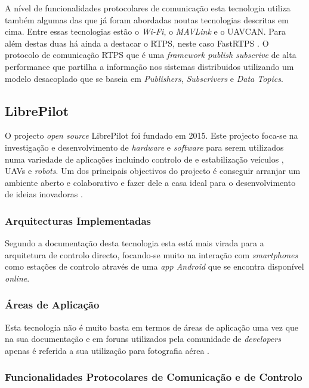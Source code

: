 A nível de funcionalidades protocolares de comunicação esta tecnologia utiliza também algumas das que já foram abordadas noutas tecnologias descritas em cima. Entre essas tecnologias estão o \textit{Wi-Fi}, o \textit{MAVLink} e o UAVCAN. Para além destas duas há ainda a destacar o RTPS, neste caso FastRTPS \cite{DronecodeProject}. O protocolo de comunicação RTPS que é uma \textit{framework publish subscrive} de alta performance que partilha a informação nos sistemas distribuidos utilizando um modelo desacoplado que se baseia em \textit{Publishers}, \textit{Subscrivers} e \textit{Data Topics}\cite{EProsima}.

\subsection{LibrePilot}

O projecto \textit{open source} LibrePilot foi fundado em 2015. Este projecto foca-se na investigação e desenvolvimento de \textit{hardware} e \textit{software} para serem utilizados numa variedade de aplicações incluindo controlo de e estabilização veículos , UAVs e \textit{robots}. Um dos principais objectivos do projecto é conseguir arranjar um ambiente aberto e colaborativo e fazer dele a casa ideal para o desenvolvimento de ideias inovadoras \cite{LibrePilot}.

\subsubsection{Arquitecturas Implementadas}

Segundo a documentação desta tecnologia esta está mais virada para a arquitetura de controlo directo, focando-se muito na interação com \textit{smartphones} como estações de controlo através de uma \textit{app Android} que se encontra disponível \textit{online}\cite{LibrePilot}.

\subsubsection{Áreas de Aplicação}

Esta tecnologia não é muito basta em termos de áreas de aplicação uma vez que na sua documentação e em foruns utilizados pela comunidade de \textit{developers} apenas é referida a sua utilização para fotografia aérea \cite{LibrePilot}.

\subsubsection{Funcionalidades Protocolares de Comunicação e de Controlo}


